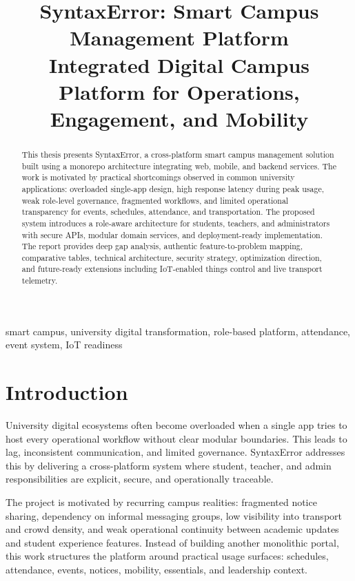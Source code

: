 \documentclass[conference]{IEEEtran}
\title{SyntaxError: Smart Campus Management Platform\\
\large Integrated Digital Campus Platform for Operations, Engagement, and Mobility}
\author{
    \IEEEauthorblockN{Team SyntaxError}
    \IEEEauthorblockA{
        Anushka Saxena, Aarushi Jain, Arya Singh, Ashutosh P. S.\\
        Assam Down Town University\\
        Public Repository: \url{https://github.com/ashupsingh/SunstoneArena}
    }
}
\begin{document}
\maketitle

\begin{abstract}
This thesis presents SyntaxError, a cross-platform smart campus management solution built using a monorepo architecture integrating web, mobile, and backend services. The work is motivated by practical shortcomings observed in common university applications: overloaded single-app design, high response latency during peak usage, weak role-level governance, fragmented workflows, and limited operational transparency for events, schedules, attendance, and transportation. The proposed system introduces a role-aware architecture for students, teachers, and administrators with secure APIs, modular domain services, and deployment-ready implementation. The report provides deep gap analysis, authentic feature-to-problem mapping, comparative tables, technical architecture, security strategy, optimization direction, and future-ready extensions including IoT-enabled things control and live transport telemetry.
\end{abstract}

\begin{IEEEkeywords}
smart campus, university digital transformation, role-based platform, attendance, event system, IoT readiness
\end{IEEEkeywords}

\section{Introduction}
University digital ecosystems often become overloaded when a single app tries to host every operational workflow without clear modular boundaries. This leads to lag, inconsistent communication, and limited governance. SyntaxError addresses this by delivering a cross-platform system where student, teacher, and admin responsibilities are explicit, secure, and operationally traceable.

The project is motivated by recurring campus realities: fragmented notice sharing, dependency on informal messaging groups, low visibility into transport and crowd density, and weak operational continuity between academic updates and student experience features. Instead of building another monolithic portal, this work structures the platform around practical usage surfaces: schedules, attendance, events, notices, mobility, essentials, and leadership context.
\end{document}
